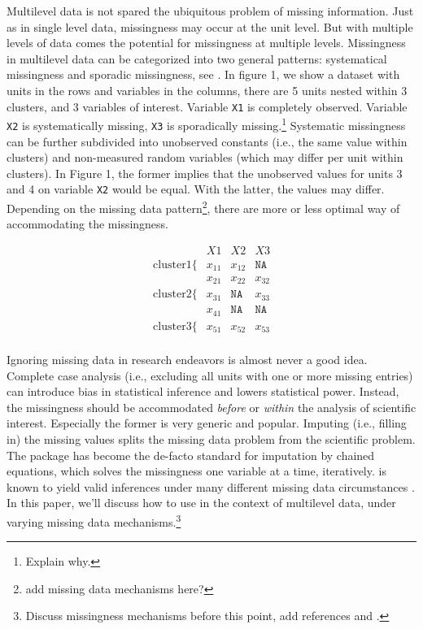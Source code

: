 \documentclass[
]{jss}
\begin{document}
Multilevel data is not spared the ubiquitous problem of missing
information. Just as in single level data, missingness may occur at the
unit level. But with multiple levels of data comes the potential for
missingness at multiple levels. Missingness in multilevel data can be
categorized into two general patterns: systematical missingness and
sporadic missingness, see \citet{resc13}. In figure 1, we show a dataset
with units in the rows and variables in the columns, there are 5 units
nested within 3 clusters, and 3 variables of interest. Variable
\texttt{X1} is completely observed. Variable \texttt{X2} is
systematically missing, \texttt{X3} is sporadically missing.\footnote{Explain
  why.} Systematic missingness can be further subdivided into unobserved
constants (i.e., the same value within clusters) and non-measured random
variables (which may differ per unit within clusters). In Figure 1, the
former implies that the unobserved values for units 3 and 4 on variable
\texttt{X2} would be equal. With the latter, the values may differ.
Depending on the missing data pattern\footnote{add missing data
  mechanisms here?}, there are more or less optimal way of accommodating
the missingness.

\[
\begin{matrix} 
                          &X1     & X2          & X3            \\
   \hline
   \mathrm{cluster 1}\{   &x_{11} &x_{12}       &\mathtt{NA}    \\
                          &x_{21} &x_{22}       &x_{32}         \\
   \mathrm{cluster 2}\{   &x_{31} &\mathtt{NA}  &x_{33}         \\
                          &x_{41} &\mathtt{NA}  &\mathtt{NA}    \\
   \mathrm{cluster 3}\{   &x_{51} &x_{52}       &x_{53}         \\
\end{matrix} 
\]

Ignoring missing data in research endeavors is almost never a good idea.
Complete case analysis (i.e., excluding all units with one or more
missing entries) can introduce bias in statistical inference and lowers
statistical power. Instead, the missingness should be accommodated
\emph{before} or \emph{within} the analysis of scientific interest.
Especially the former is very generic and popular. Imputing (i.e.,
filling in) the missing values splits the missing data problem from the
scientific problem. The  package  has become the
de-facto standard for imputation by chained equations, which solves the
missingness one variable at a time, iteratively.  is known to
yield valid inferences under many different missing data circumstances
\citep{buur18}. In this paper, we'll discuss how to use  in
the context of multilevel data, under varying missing data
mechanisms.\footnote{Discuss missingness mechanisms before this point,
  add references \citet{yuce08} and \citet{hox15}.}
\end{document}
